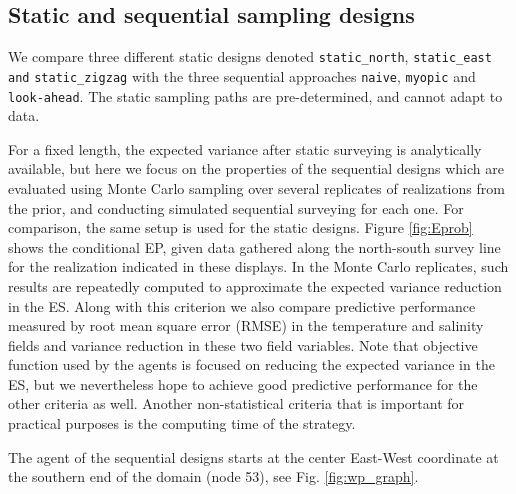 \documentclass[aoas]{imsart}
\begin{document}
\subsection{Static and sequential sampling designs}\label{sec:sampling_designs}


We compare three different static designs denoted \texttt{static\_north}, \texttt{static\_east and} \texttt{static\_zigzag} with the three sequential approaches \texttt{naive}, \texttt{myopic} and \texttt{look-ahead}. The static sampling paths are pre-determined, and cannot adapt to data. 

For a fixed length, the expected variance after static surveying is analytically available, but here we focus on the properties of the sequential designs which are evaluated using Monte Carlo sampling over several replicates of realizations from the prior, and conducting simulated sequential surveying for each one. For comparison, the same setup is used for the static designs. Figure \ref{fig:Eprob} shows the conditional EP, given data gathered along the north-south survey line for the realization indicated in these displays. In the Monte Carlo replicates, such results are repeatedly computed to approximate the expected variance reduction in the ES. Along with this criterion we also compare predictive performance measured by root mean square error (RMSE) in the temperature and salinity fields and variance reduction in these two field variables. Note that objective function used by the agents is focused on reducing the expected variance in the ES, but we nevertheless hope to achieve good predictive performance for the other criteria as well. Another non-statistical criteria that is important for practical purposes is the computing time of the strategy. 

The agent of the sequential designs starts at the center East-West coordinate at the southern end of the domain (node 53), see Fig. \ref{fig:wp_graph}.
\end{document}
